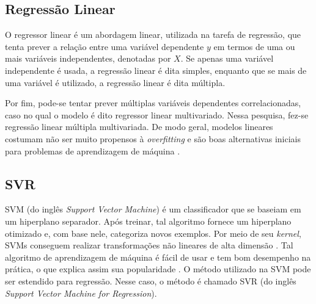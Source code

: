 \subsection{Regressão Linear}
O regressor linear é um abordagem linear, utilizada na tarefa de regressão, que tenta
prever a relação entre uma variável dependente $y$ em termos de uma ou mais variáveis
independentes, denotadas por $X$.
Se apenas uma variável independente é usada, a regressão linear é dita simples,
enquanto que se mais de uma variável é utilizado, a regressão linear é dita
múltipla. 
\par Por fim, pode-se tentar prever múltiplas variáveis dependentes
correlacionadas, caso no qual o modelo é dito regressor linear multivariado. Nessa
pesquisa, fez-se regressão linear múltipla multivariada. 
De modo geral, modelos lineares costumam não ser muito propensos à
\textit{overfitting} e são boas alternativas iniciais para problemas de aprendizagem
de máquina \cite{ml_book}. 

\subsection{SVR}
SVM (do inglês \textit{Support Vector Machine}) é um classificador que se baseiam em
um hiperplano separador. Após treinar, tal algoritmo fornece um hiperplano
otimizado e, com base nele,
categoriza novos exemplos. Por meio de seu \textit{kernel}, SVMs conseguem realizar
transformações não lineares de alta dimensão \cite{ml_second_book}. Tal algoritmo de
aprendizagem de máquina é fácil de usar e tem bom desempenho na prática, o que
explica assim sua popularidade \cite{ml_second_book}. O método utilizado na SVM pode ser
estendido para regressão. Nesse caso, o método é chamado SVR (do inglês
\textit{Support Vector Machine for Regression}). 

